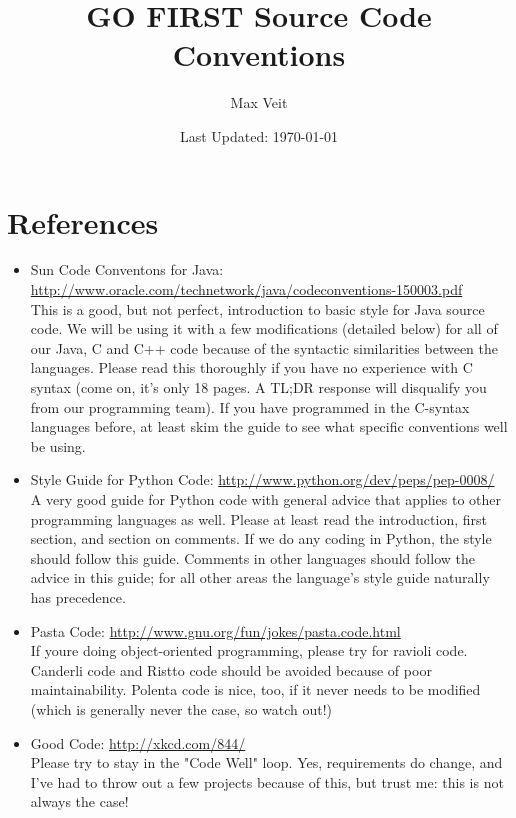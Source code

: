 \documentclass{article}
\begin{document}
\title{GO FIRST Source Code Conventions}
\author{Max Veit}
\date{Last Updated: \today}

\maketitle
\tableofcontents

\section{References}
\label{sec:references}
\begin{itemize}
    \item Sun Code Conventons for Java: \url{http://www.oracle.com/technetwork/java/codeconventions-150003.pdf} \\
        This is a good, but not perfect, introduction to basic style for Java source code. We will be using it with a few modifications (detailed below) for all of our Java, C and C++ code because of the syntactic similarities between the languages. Please read this thoroughly if you have no experience with C syntax (come on, it's only 18 pages. A TL;DR response will disqualify you from our programming team). If you have programmed in the C-syntax languages before, at least skim the guide to see what specific conventions well be using.
    \item \label{pyguide} Style Guide for Python Code: \url{http://www.python.org/dev/peps/pep-0008/} \\
        A very good guide for Python code with general advice that applies to other programming languages as well. Please at least read the introduction, first section, and section on comments. If we do any coding in Python, the style should follow this guide. Comments in other languages should follow the advice in this guide; for all other areas the language's style guide naturally has precedence.
    \item Pasta Code: \url{http://www.gnu.org/fun/jokes/pasta.code.html} \\
        If youre doing object-oriented programming, please try for ravioli code. Canderli code and Ristto code should be avoided because of poor maintainability. Polenta code is nice, too, if it never needs to be modified (which is generally never the case, so watch out!)
    \item Good Code: \url{http://xkcd.com/844/} \\
        Please try to stay in the "Code Well" loop. Yes, requirements do change, and I've had to throw out a few projects because of this, but trust me: this is not always the case!
\end{itemize}
\end{document}
